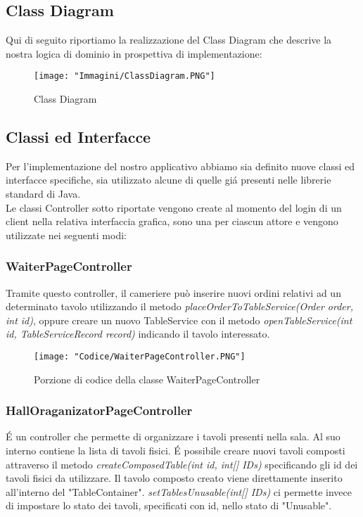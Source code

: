 \documentclass{article}
\begin{document}

\newpage

\subsection{Class Diagram}
Qui di seguito riportiamo la realizzazione del Class Diagram che descrive la nostra logica di dominio in prospettiva di implementazione:

\begin{figure}[!h]
\centering
\texttt{[image: "Immagini/ClassDiagram.PNG"]}
\caption{Class Diagram}
\label{ClassDiagram}
\end{figure}

\newpage

\subsection{Classi ed Interfacce}
Per l'implementazione del nostro applicativo abbiamo sia definito nuove classi ed interfacce specifiche, sia utilizzato alcune di quelle gi\'a presenti nelle librerie standard di Java. \\
Le classi Controller sotto riportate vengono create al momento del login di un client nella relativa interfaccia grafica, sono una per ciascun attore e vengono utilizzate nei seguenti modi: 

\subsubsection{WaiterPageController}

Tramite questo controller, il cameriere può inserire nuovi ordini relativi ad un determinato tavolo utilizzando il metodo \textit{placeOrderToTableService(Order order, int id)}, oppure creare un nuovo TableService con il metodo \textit{openTableService(int id, TableServiceRecord record)} indicando il tavolo interessato.

\begin{figure}[!h]
\centering
\texttt{[image: "Codice/WaiterPageController.PNG"]}
\caption{Porzione di codice della classe WaiterPageController}
\end{figure}


\subsubsection{HallOraganizatorPageController}

\'E un controller che permette di organizzare i tavoli presenti nella sala. Al suo interno contiene la lista di tavoli fisici. \'E possibile creare nuovi tavoli composti attraverso il metodo  \textit{createComposedTable(int id, int[] IDs)} specificando gli id dei tavoli fisici da utilizzare. Il tavolo composto creato viene direttamente inserito all'interno del "TableContainer".
\textit{setTablesUnusable(int[] IDs)} ci permette invece di impostare lo stato dei tavoli, specificati con id, nello stato di "Unusable".
\end{document}

